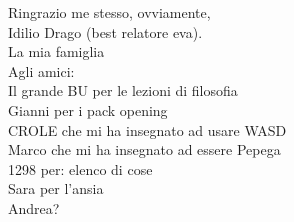 \thispagestyle{empty}
\begin{flushright}

\vspace*{30mm}

Ringrazio me stesso, ovviamente,\\
Idilio Drago (best relatore eva).\\
La mia famiglia\\
\vspace{5mm}
Agli amici:\\
Il grande BU per le lezioni di filosofia\\
Gianni per i pack opening\\
CROLE che mi ha insegnato ad usare WASD\\
Marco che mi ha insegnato ad essere Pepega\\
1298 per: elenco di cose\\
Sara per l'ansia\\
Andrea?


\end{flushright}
\newpage\null\thispagestyle{empty}\newpage
